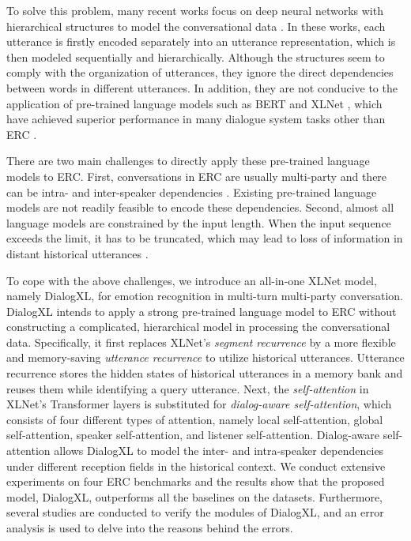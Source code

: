 \documentclass[letterpaper]{article} \usepackage{aaai21}  \usepackage{times}  \usepackage{helvet} \usepackage{courier}  \usepackage[hyphens]{url}  \usepackage{graphicx} \usepackage{amstext}
\begin{document}
To solve this problem, many recent works focus on deep neural networks with hierarchical structures to model the conversational data \cite{majumder2019dialoguernn, ghosal2019dialoguegcn,jiao2019higru,zhong2019knowledge}. In these works, each utterance is firstly encoded separately into an utterance representation, which is then modeled sequentially and hierarchically. Although the structures seem to comply with the organization of utterances, they ignore the direct dependencies between words in different utterances. In addition, they are not conducive to the application of pre-trained language models such as BERT \cite{devlin2018bert} and XLNet \cite{yang2019xlnet}, which have achieved superior performance in many dialogue system tasks other than ERC \cite{madotto2018mem2seq,bao2020plato,henderson2019convert}. 

There are two main challenges to directly apply these pre-trained language models to ERC. First, conversations in ERC are usually multi-party and there can be intra- and inter-speaker dependencies \cite{ghosal2019dialoguegcn}. Existing pre-trained language models are not readily feasible to encode these dependencies. Second, almost all language models are constrained by the input length. When the input sequence exceeds the limit, it has to be truncated, which may lead to loss of information in distant historical utterances \cite{majumder2019dialoguernn,ghosal2019dialoguegcn}.

To cope with the above challenges, we introduce an all-in-one XLNet model, namely DialogXL, for emotion recognition in multi-turn multi-party conversation. DialogXL intends to apply a strong pre-trained language model to ERC without constructing a complicated, hierarchical model in processing the conversational data. Specifically, it first replaces XLNet's \emph{segment recurrence} by a more flexible and memory-saving \emph{utterance recurrence} to utilize historical utterances. Utterance recurrence stores the hidden states of historical utterances in a memory bank and reuses them while identifying a query utterance. Next, the \emph{self-attention} in XLNet's Transformer layers is substituted for \emph{dialog-aware self-attention}, which consists of four different types of attention, namely local self-attention, global self-attention, speaker self-attention, and listener self-attention. Dialog-aware self-attention allows DialogXL to model the inter- and intra-speaker dependencies under different reception fields in the historical context. We conduct extensive experiments on four ERC benchmarks and the results show that the proposed model, DialogXL, outperforms all the baselines on the datasets. Furthermore, several studies are conducted to verify the modules of DialogXL, and an error analysis is used to delve into the reasons behind the errors.
\end{document}
